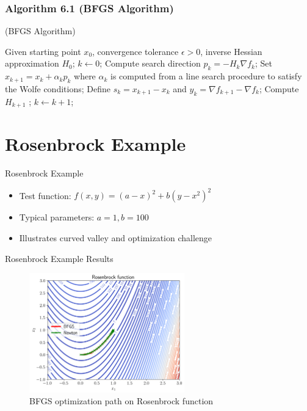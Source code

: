 \documentclass{beamer}
\begin{document}
\begin{frame}[t]
	\frametitle{Algorithm 6.1 (BFGS Algorithm)}
	\begin{algorithm}[H]
		\caption{(BFGS Algorithm)}
		\label{alg:bfgs}
		\begin{algorithmic}[1]
			\REQUIRE Given starting point $x_0$, convergence tolerance $\epsilon > 0$, inverse Hessian approximation $H_0$;
			\STATE $k \leftarrow 0$;
			\STATE Compute search direction
			\STATE $p_k = -H_k \nabla f_k$;
			\STATE Set $x_{k+1} = x_k + \alpha_k p_k$ where $\alpha_k$ is computed from a line search procedure to satisfy the Wolfe conditions;
			\STATE Define $s_k = x_{k+1} - x_k$ and $y_k = \nabla f_{k+1} - \nabla f_k$;
			\STATE Compute $H_{k+1}$ ;
			\STATE $k \leftarrow k + 1$;
			\ENDWHILE
		\end{algorithmic}
	\end{algorithm}
\end{frame}
\section{Rosenbrock Example}
\begin{frame}{Rosenbrock Example}
	\begin{itemize}
		\item Test function: $f(x,y) = (a - x)^2 + b(y - x^2)^2$
		\item Typical parameters: $a=1, b=100$
		\item Illustrates curved valley and optimization challenge
	\end{itemize}
\end{frame}

\begin{frame}{Rosenbrock Example Results}
	\begin{figure}
		\centering
		\includegraphics[width=0.6\textwidth]{./figs/rosenbrock_contour.png}
		\caption{BFGS optimization path on Rosenbrock function}
	\end{figure}
\end{frame}
\end{document}
